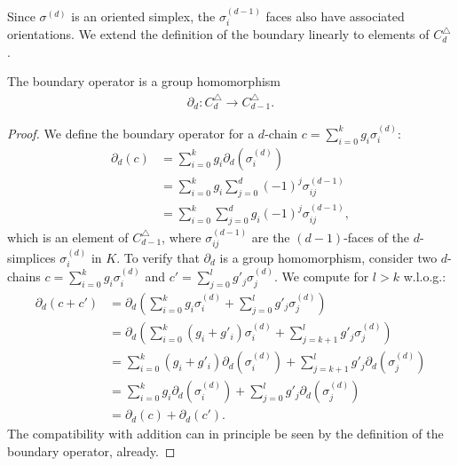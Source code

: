 Since \( \sigma^{(d)} \) is an oriented simplex, the \( \sigma^{(d-1)}_{i} \) faces also have associated orientations. We extend the definition of the boundary linearly to elements of \( C^{\triangle}_{d} \).

\begin{lemma}
	The boundary operator is a group homomorphism
	\begin{align}
		\partial_d: C^{\triangle}_{d} \to C^{\triangle}_{d-1}. 
	\end{align}
\end{lemma}

\begin{proof}
	We define the boundary operator for a \( d \)-chain \( c = \sum_{i=0}^{k} g_{i} \sigma_{i}^{(d)} \):
	\begin{align}
		\partial_d(c) & = \sum_{i=0}^{k} g_{i} \partial_d(\sigma_{i}^{(d)})                    \\
		            & = \sum_{i=0}^{k} g_{i} \sum_{j=0}^{d} (-1)^{j} \sigma_{ij}^{(d-1)}  \\
		            & = \sum_{i=0}^{k} \sum_{j=0}^{d} g_{i} (-1)^{j} \sigma_{ij}^{(d-1)}, 
	\end{align}
	which is an element of \( C^{\triangle}_{d-1} \), where \( \sigma_{ij}^{(d-1)} \) are the \( (d-1) \)-faces of the \( d \)-simplices \( \sigma_{i}^{(d)} \) in \( K \). To verify that \( \partial_d \) is a group homomorphism, consider two \( d \)-chains \( c = \sum_{i=0}^{k} g_{i} \sigma_{i}^{(d)} \) and \( c' = \sum_{j=0}^{l} g'_{j} \sigma_{j}^{(d)} \). We compute for $l > k$ w.l.o.g.:
	\begin{align}
		\partial_d(c + c') & = \partial_d( \sum_{i=0}^{k} g_{i} \sigma_{i}^{(d)} + \sum_{j=0}^{l} g'_{j} \sigma_{j}^{(d)} ) \\
		                 & = \partial_d( \sum_{i=0}^{k} (g_{i} + g'_i) \sigma_{i}^{(d)} + \sum_{j=k+1}^{l} g'_{j} \sigma_{j}^{(d)} ) \\
		                 & = \sum_{i=0}^{k} (g_{i}+g'_i) \partial_d(\sigma_{i}^{(d)}) + \sum_{j=k+1}^{l} g'_{j} \partial_d(\sigma_{j}^{(d)})    \\
		                 & = \sum_{i=0}^{k} g_{i} \partial_d(\sigma_{i}^{(d)}) + \sum_{j=0}^{l} g'_{j} \partial_d(\sigma_{j}^{(d)})    \\
		                 & = \partial_d(c) + \partial_d(c').                                                                           
	\end{align}
	The compatibility with addition can in principle be seen by the definition of the boundary operator, already.
\end{proof}

